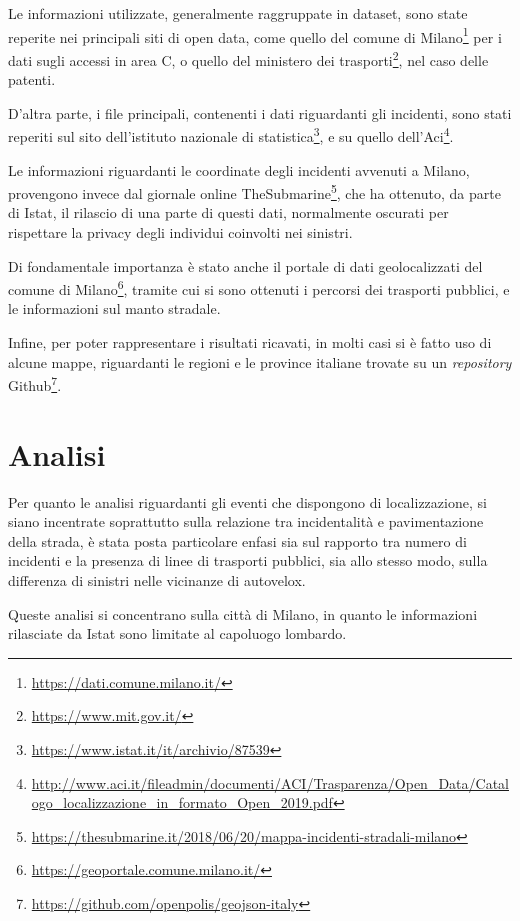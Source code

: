 \documentclass[a4paper]{article}
\begin{document}
Le informazioni utilizzate, generalmente raggruppate in dataset, sono 
state reperite nei principali siti di open data, come quello del comune di 
Milano\footnote{\url{https://dati.comune.milano.it/}} per i dati sugli accessi in area C, 
o quello del ministero dei trasporti\footnote{\url{https://www.mit.gov.it/}}, 
nel caso delle patenti.

D'altra parte, i file principali, contenenti i dati riguardanti gli incidenti, sono 
stati reperiti sul sito 
dell'istituto nazionale di statistica\footnote{\url{https://www.istat.it/it/archivio/87539}}, 
e su quello dell'Aci\footnote{\url{http://www.aci.it/fileadmin/documenti/ACI/Trasparenza/Open_Data/Catalogo_localizzazione_in_formato_Open_2019.pdf}}. 

Le informazioni riguardanti le coordinate degli incidenti avvenuti a Milano, 
provengono invece dal giornale online 
TheSubmarine\footnote{\url{https://thesubmarine.it/2018/06/20/mappa-incidenti-stradali-milano}}, 
che ha ottenuto, da parte di Istat, il rilascio di una parte di questi dati, 
normalmente oscurati per rispettare la privacy degli individui coinvolti nei sinistri. 


Di fondamentale importanza è stato anche il portale di dati geolocalizzati del comune di 
Milano\footnote{\url{https://geoportale.comune.milano.it/}}, 
tramite cui si sono ottenuti i percorsi dei trasporti pubblici, e le 
informazioni sul manto stradale.

Infine, per poter rappresentare i risultati ricavati, in molti casi si è fatto uso di 
alcune mappe, riguardanti le regioni e le province italiane trovate su un \textit{repository} 
Github\footnote{\url{https://github.com/openpolis/geojson-italy}}.

\section{Analisi}

Per quanto le analisi riguardanti gli eventi che dispongono di localizzazione, 
si siano incentrate soprattutto sulla relazione tra incidentalità e pavimentazione 
della strada, è stata posta particolare enfasi sia sul rapporto tra numero di 
incidenti e la presenza di linee di trasporti pubblici, sia 
allo stesso modo, sulla differenza di sinistri nelle vicinanze di autovelox. 

Queste analisi si concentrano sulla città di Milano, in quanto le informazioni rilasciate da 
Istat sono limitate al capoluogo lombardo.
\end{document}
